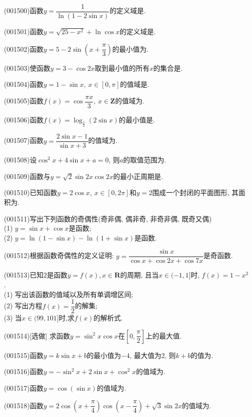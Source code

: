 \item (001500)函数$y=\dfrac{1}{\ln (1-2\sin x)}$的定义域是.
\item (001501)函数$y=\sqrt{25-x^2}+\ln \cos x$的定义域是.
\item (001502)函数$y=5-2\sin\left(x+\dfrac{\pi}{3}\right)$的最小值为.
\item (001503)使函数$y=3-\cos 2x$取到最小值的所有$x$的集合是.
\item (001504)函数$y=1-\sin x, \  x \in [0,\pi]$的值域是.
\item (001505)函数$f(x)=\cos \dfrac{\pi x}{3}, \ x \in \mathbf{Z}$的值域为.
\item (001506)函数$f(x)=\log_{\frac{1}{2}} (2\sin x)$的最小值是.
\item (001507)函数$y=\dfrac{2\sin x-1}{\sin x+3}$的值域为.
\item (001508)设$\cos^2x+4\sin x+a=0$, 则$a$的取值范围为.
\item (001509)函数与$y=\sqrt{2}\sin 2x\cos 2x$的最小正周期是.
\item (001510)已知函数$y=2\cos x, \ x \in [0,2\pi]$和$y=2$围成一个封闭的平面图形, 其面积为.
\item (001511)写出下列函数的奇偶性(奇非偶, 偶非奇, 非奇非偶, 既奇又偶)\\ 
(1) $y=\sin x+\cos x$是函数;\\ 
(2) $y=\ln(1-\sin x)-\ln (1+\sin x)$是函数.
\item (001512)根据函数奇偶性的定义证明: $y=\dfrac{\sin x}{\cos x+\cos 2x+\cos 7x}$是奇函数.
\item (001513)已知$2$是函数$y=f(x),x\in\mathbf{R}$的周期, 且当$x\in(-1,1]$时, $f(x)=1-x^2$.\\ 
(1) 写出该函数的值域以及所有单调增区间;\\ 
(2) 写出方程$f(x)=\dfrac{1}{2}$的解集;\\ 
(3) 当$x\in(99,101]$时,求$f(x)$的解析式.
\item (001514)[选做]
求函数$y=\sin^2 x\cos x$在$\left[0,\dfrac{\pi}{2}\right]$上的最大值.
\item (001515)函数$y=k\sin x+b$的最小值为$-4$, 最大值为$2$, 则$k+b$的值为.
\item (001516)函数$y=-\sin^2 x+2\sin x+\cos^2 x$的值域为.
\item (001517)函数$y=\cos(\sin x)$的值域为.
\item (001518)函数$y=2\cos\left(x+\dfrac{\pi}{4}\right)\cos\left(x-\dfrac{\pi}{4}\right)+\sqrt{3}\sin 2x$的值域为.
